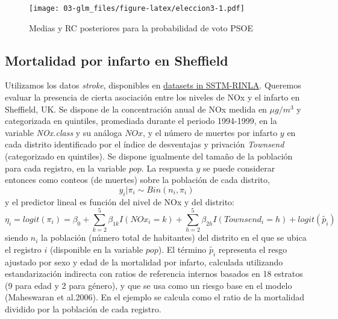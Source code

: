 \documentclass[
]{book}
\begin{document}
\begin{figure}
\centering
\texttt{[image: 03-glm\_files/figure-latex/eleccion3-1.pdf]}
\caption{\label{fig:eleccion3}Medias y RC posteriores para la probabilidad de voto PSOE}
\end{figure}

\hypertarget{mortalidad-por-infarto-en-sheffield}{%
\subsection{Mortalidad por infarto en Sheffield}\label{mortalidad-por-infarto-en-sheffield}}

Utilizamos los datos \emph{stroke}, disponibles en \href{https://sites.google.com/a/r-inla.org/stbook/datasets}{datasets in SSTM-RINLA}. Queremos evaluar la presencia de cierta asociación entre los niveles de NOx y el infarto en Sheffield, UK. Se dispone de la concentración anual de NOx medida en \(\mu g/m^3\) y categorizada en quintiles, promediada durante el periodo 1994-1999, en la variable \emph{NOx.class} y su análoga \(NOx\), y el número de muertes por infarto \(y\) en cada distrito identificado por el índice de desventajas y privación \emph{Townsend} (categorizado en quintiles). Se dispone igualmente del tamaño de la población para cada registro, en la variable \(pop\). La respuesta \(y\) se puede considerar entonces como conteos (de muertes) sobre la población de cada distrito,
\[y_i|\pi_i \sim Bin(n_i, \pi_i)\]
y el predictor lineal es función del nivel de NOx y del distrito:
\[\eta_i=logit(\pi_i)=\beta_0 + \sum_{k=2}^5 \beta_{1k} I(NOx_i=k)+ \sum_{h=2}^5 \beta_{2h} I(Townsend_i=h)+logit(\tilde{p_i})\]
siendo \(n_i\) la población (número total de habitantes) del distrito en el que se ubica el registro \(i\) (disponible en la variable \(pop\)). El término \(\tilde{p_i}\) representa el resgo ajustado por sexo y edad de la mortalidad por infarto, calculada utilizando estandarización indirecta con ratios de referencia internos basados en 18 estratos (9 para edad y 2 para género), y que se usa como un riesgo base en el modelo (Maheswaran et al.2006). En el ejemplo se calcula como el ratio de la mortalidad dividido por la población de cada registro.
\end{document}
